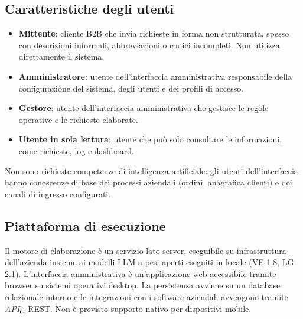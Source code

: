 \subsection{Caratteristiche degli utenti}
	\begin{itemize}
		\item \textbf{Mittente}: cliente B2B che invia richieste in forma non strutturata, spesso con descrizioni informali, abbreviazioni o codici incompleti. Non utilizza direttamente il sistema.
		\item \textbf{Amministratore}: utente dell'interfaccia amministrativa responsabile della configurazione del sistema, degli utenti e dei profili di accesso.
		\item \textbf{Gestore}: utente dell'interfaccia amministrativa che gestisce le regole operative e le richieste elaborate.
		\item \textbf{Utente in sola lettura}: utente che può solo consultare le informazioni, come richieste, log e dashboard.
	\end{itemize}
Non sono richieste competenze di intelligenza artificiale: gli utenti dell'interfaccia hanno conoscenze di base dei processi aziendali (ordini, anagrafica clienti) e dei canali di ingresso configurati.

\subsection{Piattaforma di esecuzione}
Il motore di elaborazione è un servizio lato server, eseguibile su infrastruttura dell'azienda insieme ai modelli LLM a pesi aperti eseguiti in locale (VE-1.8, LG-2.1). L'interfaccia amministrativa è un'applicazione web accessibile tramite browser su sistemi operativi desktop. La persistenza avviene su un database relazionale interno e le integrazioni con i software aziendali avvengono tramite \textit{API}\textsubscript{G} REST. Non è previsto supporto nativo per dispositivi mobile.

